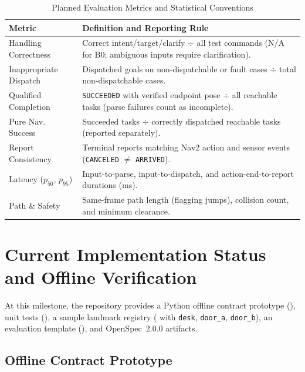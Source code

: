\documentclass[conference,a4paper]{IEEEtran}
\begin{document}
\begin{table}[!t]
\caption{Planned Evaluation Metrics and Statistical Conventions}
\label{tab:metrics}
\centering
\scriptsize
\setlength{\tabcolsep}{3pt}
\begin{tabularx}{\columnwidth}{@{} >{\raggedright\arraybackslash}p{2.35cm} >{\raggedright\arraybackslash}X @{}}
\toprule
\textbf{Metric} & \textbf{Definition and Reporting Rule} \\
\midrule
Handling Correctness & Correct intent/target/clarify $\div$ all test commands (N/A for B0; ambiguous inputs require clarification). \\
Inappropriate Dispatch & Dispatched goals on non-dispatchable or fault cases $\div$ total non-dispatchable cases. \\
Qualified Completion & \texttt{SUCCEEDED} with verified endpoint pose $\div$ all reachable tasks (parse failures count as incomplete). \\
Pure Nav. Success & Succeeded tasks $\div$ correctly dispatched reachable tasks (reported separately). \\
Report Consistency & Terminal reports matching Nav2 action and sensor events (\texttt{CANCELED} $\neq$ \texttt{ARRIVED}). \\
Latency ($p_{50}$, $p_{95}$) & Input-to-parse, input-to-dispatch, and action-end-to-report durations (ms). \\
Path \& Safety & Same-frame path length (flagging jumps), collision count, and minimum clearance. \\
\bottomrule
\end{tabularx}
\end{table}

\section{Current Implementation Status and Offline Verification}

At this milestone, the repository provides a Python offline contract prototype (), unit tests (), a sample landmark registry ( with \texttt{desk}, \texttt{door\_a}, \texttt{door\_b}), an evaluation template (), and OpenSpec~2.0.0 artifacts.

\subsection{Offline Contract Prototype}
\end{document}
